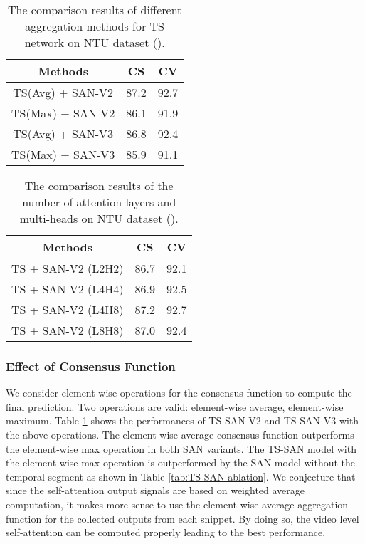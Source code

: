 \documentclass[10pt,twocolumn,letterpaper]{article}
\begin{document}
\begin{table}[!t]
	\begin{center}
	\begin{tabular}{|c|c|c|}
		\hline
		Methods & CS & CV\\
		\hline
		TS(Avg) + SAN-V2 & 87.2  & 92.7\\
		TS(Max) + SAN-V2 & 86.1  & 91.9\\
		TS(Avg) + SAN-V3 & 86.8  & 92.4\\
		TS(Max) + SAN-V3 & 85.9  & 91.1\\
		\hline
	\end{tabular}
	\end{center}
	\vspace{-0.15in}
	\caption{The comparison results of different aggregation methods for TS network on NTU dataset ().}
	\label{tab:TS-agg-ablation}
\end{table}
\begin{table}[!t]
	\begin{center}
	\begin{tabular}{|c|c|c|}
		\hline
		Methods & CS & CV\\
		\hline
		TS + SAN-V2 (L2H2) & 86.7 & 92.1\\
		TS + SAN-V2 (L4H4) & 86.9 & 92.5\\
		TS + SAN-V2 (L4H8) & 87.2 & 92.7\\
		TS + SAN-V2 (L8H8) & 87.0 & 92.4\\
		\hline
	\end{tabular}
	\end{center}
	\vspace{-0.15in}
	\caption{The comparison results of the number of attention layers and multi-heads on NTU dataset  ().}
	\label{tab:SAN-LH-ablation}
\end{table}

\subsubsection{Effect of Consensus Function}
We consider element-wise operations for the consensus function to compute the final prediction.
Two operations are valid: element-wise average, element-wise maximum.
Table \ref{tab:TS-agg-ablation} shows the performances of TS-SAN-V2 and TS-SAN-V3 with the above operations.
The element-wise average consensus function outperforms the element-wise max operation in both SAN variants.
The TS-SAN model with the element-wise max operation is outperformed by the SAN model without the temporal segment as shown in Table \ref{tab:TS-SAN-ablation}.
We conjecture that since the self-attention output signals are based on weighted average computation, it makes more sense to use the element-wise average aggregation function for the collected outputs from each snippet. By doing so, the video level self-attention can be computed properly leading to the best performance.
\end{document}
